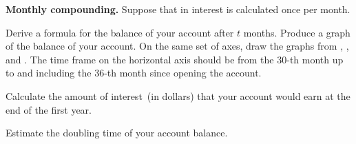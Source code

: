\documentclass[a4paper,oneside,12pt]{article}
\begin{document}
\begin{exercise}
\textbf{Monthly compounding.}
Suppose that in  interest is
calculated once per month.
\begin{packedenum}
\item\label{subex:exponential:savings_monthly_formula}
  Derive a formula for the balance of your account after $t$ months.
  Produce a graph of the balance of your account.  On the same set of
  axes, draw the graphs from
  ,
  ,
  and
  .
  The time frame on the horizontal axis should be from the $30$-th
  month up to and including the $36$-th month since opening the
  account.

\item\label{subex:exponential:savings_monthly_interest}
  Calculate the amount of interest~(in dollars) that your account
  would earn at the end of the first year.

\item\label{subex:exponential:savings_monthly_doubling_time}
  Estimate the doubling time of your account balance.
\end{packedenum}
\end{exercise}
\end{document}
